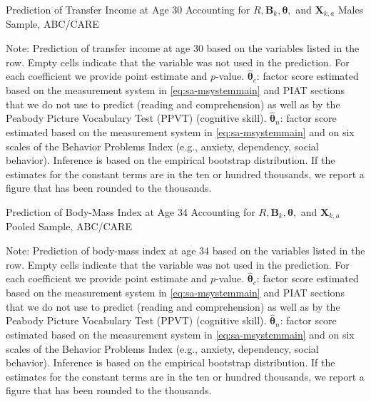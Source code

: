 \begin{table}
\begin{threeparttable}
\caption{Prediction of Transfer Income at Age 30 Accounting for $R, \bm{B}_k, \bm{\theta},$ and $\bm{X}_{k,a}$ Males Sample, ABC/CARE}
\centering
\scriptsize

\begin{tablenotes}
\footnotesize
\item Note: Prediction of transfer income at age 30 based on the variables listed in the row. Empty cells indicate that the variable was not used in the prediction. For each coefficient we provide point estimate and $p$-value. $\hat{\bm{\theta}}_{c}$: factor score estimated based on the measurement system in \eqref{eq:sa-msystemmain} and PIAT sections that we do not use to predict (reading and comprehension) as well as by the Peabody Picture Vocabulary Test (PPVT) (cognitive skill). $\hat{\bm{\theta}}_{n}$: factor score estimated based on the measurement system in \eqref{eq:sa-msystemmain} and on six scales of the Behavior Problems Index (e.g., anxiety, dependency, social behavior). Inference is based on the empirical bootstrap distribution. If the estimates for the constant terms are in the ten or hundred thousands, we report a figure that has been rounded to the thousands.
\end{tablenotes}
\end{threeparttable}
\end{table}

\begin{table}
\begin{threeparttable}
\caption{Prediction of Body-Mass Index at Age 34 Accounting for $R, \bm{B}_k, \bm{\theta},$ and $\bm{X}_{k,a}$ Pooled Sample, ABC/CARE}
\centering
\scriptsize

\begin{tablenotes}
\footnotesize
\item Note: Prediction of body-mass index at age 34 based on the variables listed in the row. Empty cells indicate that the variable was not used in the prediction. For each coefficient we provide point estimate and $p$-value. $\hat{\bm{\theta}}_{c}$: factor score estimated based on the measurement system in \eqref{eq:sa-msystemmain} and PIAT sections that we do not use to predict (reading and comprehension) as well as by the Peabody Picture Vocabulary Test (PPVT) (cognitive skill). $\hat{\bm{\theta}}_{n}$: factor score estimated based on the measurement system in \eqref{eq:sa-msystemmain} and on six scales of the Behavior Problems Index (e.g., anxiety, dependency, social behavior). Inference is based on the empirical bootstrap distribution. If the estimates for the constant terms are in the ten or hundred thousands, we report a figure that has been rounded to the thousands.
\end{tablenotes}
\end{threeparttable}
\end{table}

